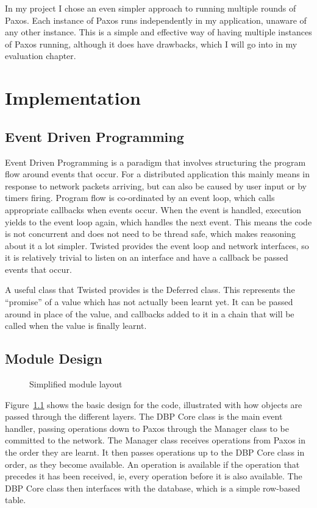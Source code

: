 \documentclass[12pt,twoside,notitlepage]{report}
\newcommand{\lwincludegraphics}[2][]{%
  \sbox{0}{\texttt{[image: \#2]}}%
  \ifdim\wd0>\linewidth
    \resizebox{\linewidth}{!}{\box0 }%
  \else
    \leavevmode\box0
  \fi}
\begin{document}
In my project I chose an even simpler approach to running multiple rounds of Paxos. Each instance
of Paxos runs independently in my application, unaware of any other instance. This is a simple and
effective way of having multiple instances of Paxos running, although it does have drawbacks,
which I will go into in my evaluation chapter.


\cleardoublepage
\chapter{Implementation}

\section{Event Driven Programming}

Event Driven Programming is a paradigm that involves structuring the program flow around events
that occur. For a distributed application this mainly means in response to network packets
arriving, but can also be caused by user input or by timers firing. Program flow is co-ordinated
by an event loop, which calls appropriate callbacks when events occur. When the event is handled,
execution yields to the event loop again, which handles the next event. This means the code is not
concurrent and does not need to be thread safe, which makes reasoning about it a lot simpler.
Twisted provides the event loop and network interfaces, so it is relatively trivial to listen on
an interface and have a callback be passed events that occur.

A useful class that Twisted provides is the Deferred class. This represents the ``promise'' of a
value which has not actually been learnt yet. It can be passed around in place of the value, and
callbacks added to it in a chain that will be called when the value is finally learnt.

\section{Module Design}

\begin{figure}[htb]
\centering
\lwincludegraphics[scale=0.5]{figs/module-layout.eps}
\caption{\label{fig:module-layout}Simplified module layout}
\end{figure}

Figure~\ref{fig:module-layout} shows the basic design for the code, illustrated with how objects
are passed through the different layers. The DBP Core class is the main event handler, passing
operations down to Paxos through the Manager class to be committed to the network. The Manager
class receives operations from Paxos in the order they are learnt. It then passes operations up to
the DBP Core class in order, as they become available. An operation is available if the operation
that precedes it has been received, ie, every operation before it is also available. The DBP Core
class then interfaces with the database, which is a simple row-based table.
\end{document}
